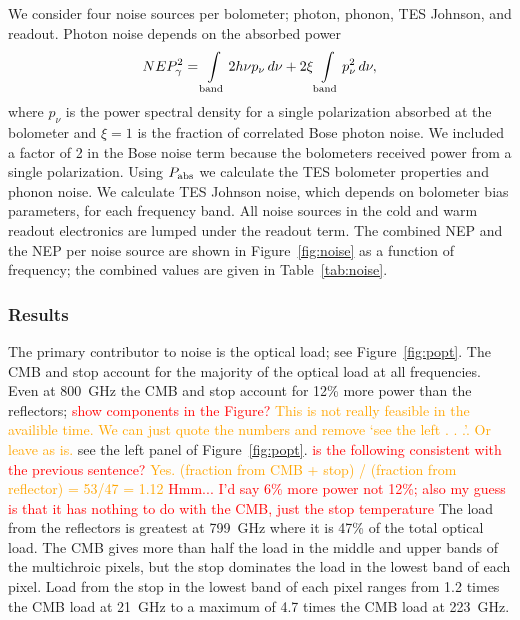 \documentclass[]{spie}  %
\newcommand{\comr}[1]{\textcolor{red}{#1}}
\newcommand{\como}[1]{\textcolor{orange}{#1}}
\begin{document}
We consider four noise sources per bolometer; photon, phonon, TES Johnson, and readout. 
Photon noise depends on the absorbed power\cite{richards1994} 
\begin{equation}
\label{eq:photon}
NEP_{\gamma}^2 = \int\limits_{\rm band} 2h\nu p_{\nu} \, d\nu + 2\xi \int\limits_{\rm band} p_{\nu}^2 \,  d\nu,
\end{equation} 
where $p_{\nu}$ is the power spectral density for a single polarization absorbed at the bolometer and $\xi=1$ is the fraction of correlated Bose 
photon noise. We included a factor of 2 in the Bose noise term because the bolometers received power from a single 
polarization. 
Using $P_{\rm abs}$ we calculate the TES bolometer properties and phonon noise.\cite{mather1982}  
We calculate TES Johnson noise, which depends on bolometer bias parameters, for each frequency band.  
All noise sources in the cold and warm readout electronics are lumped under the readout term.  
The combined NEP and the NEP per noise source are shown in 
Figure~\ref{fig:noise} as a function of frequency; the combined values are given in Table~\ref{tab:noise}.

\subsubsection{Results}  

The primary contributor to noise is the optical load; see Figure~\ref{fig:popt}. 
The CMB and stop account for the majority of the optical load 
at all frequencies. Even at 800~GHz the CMB and stop
account for 12\% more power than the reflectors;  \comr{show components in the Figure?} 
\como{This is not really feasible in the availible time. We can just quote the numbers and remove `see the left . . .'.  Or leave as is.}
see the left panel of Figure~\ref{fig:popt}.
\comr{is the following consistent with the previous sentence?} \como{Yes. (fraction from CMB + stop) / (fraction from reflector) = 53/47 = 1.12} 
\comr{Hmm... I'd say 6\% more power not 12\%; also my guess is that it has nothing to do with the CMB, just the stop temperature}
The load from the reflectors is greatest at 799~GHz where it is 47\% of the total 
optical load. The CMB gives more than half the load 
in the middle and upper bands of the multichroic pixels, but the stop dominates the load in the lowest band of each pixel.  
Load from the stop in the lowest band of each pixel ranges from 1.2 times the CMB load at 21~GHz to a maximum of 4.7 
times the CMB load at 223~GHz. 
\end{document}
